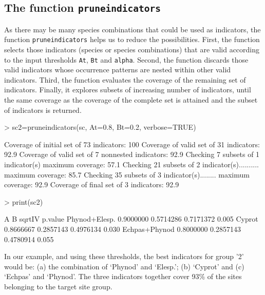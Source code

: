 \documentclass[11pt,a4paper]{article}
\begin{document}
\subsection{The function \texttt{pruneindicators}}
As there may be many species combinations that could be used as indicators, the function \texttt{pruneindicators} helps us to reduce the possibilities. First, the function selects those indicators (species or species combinations) that are valid according to the input thresholds \texttt{At}, \texttt{Bt} and \texttt{alpha}. Second, the function discards those valid indicators whose occurrence patterns are nested within other valid indicators. Third, the function evaluates the coverage of the remaining set of indicators. Finally, it explores subsets of increasing number of indicators, until the same coverage as the coverage of the complete set is attained and the subset of indicators is returned.
\begin{Schunk}
\begin{Sinput}
> sc2=pruneindicators(sc, At=0.8, Bt=0.2, verbose=TRUE)
\end{Sinput}
\begin{Soutput}
Coverage of initial set of 73 indicators: 100%
Coverage of valid set of 31 indicators: 92.9%
Coverage of valid set of 7 nonnested indicators: 92.9%
Checking 7 subsets of 1 indicator(s) maximum coverage: 57.1%
Checking 21 subsets of 2 indicator(s).......... maximum coverage: 85.7%
Checking 35 subsets of 3 indicator(s)........ maximum coverage: 92.9%
Coverage of final set of 3 indicators: 92.9%
\end{Soutput}
\begin{Sinput}
> print(sc2)
\end{Sinput}
\begin{Soutput}
                      A         B    sqrtIV p.value
Phynod+Elesp. 0.9000000 0.5714286 0.7171372   0.005
Cyprot        0.8666667 0.2857143 0.4976134   0.030
Echpas+Phynod 0.8000000 0.2857143 0.4780914   0.055
\end{Soutput}
\end{Schunk}
In our example, and using these thresholds, the best indicators for group '2' would be: (a) the combination of `Phynod' and `Elesp.'; (b) `Cyprot' and (c) `Echpas' and `Phynod'. The three indicators together cover 93\% of the sites belonging to the target site group.
\end{document}
